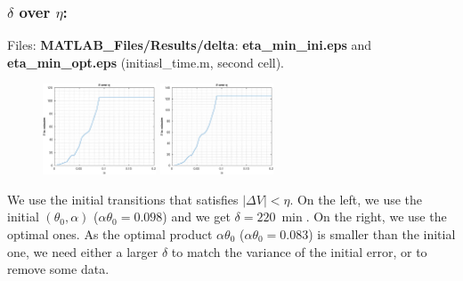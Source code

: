 \documentclass[aspectratio=169]{beamer}\usepackage[utf8]{inputenc}
\begin{document}
\begin{frame}\frametitle{$\delta$ over $\eta$:}

Files: \textbf{MATLAB\_Files/Results/delta}: \textbf{eta\_min\_ini.eps} and \textbf{eta\_min\_opt.eps} (initiasl\_time.m, second cell).\\

\begin{figure}[ht!]
\centering
\includegraphics[width=0.3\textwidth]{../../MATLAB_Files/Results/delta/eta_min_ini.eps}\quad\quad
\includegraphics[width=0.3\textwidth]{../../MATLAB_Files/Results/delta/eta_min_opt.eps}
\end{figure}
We use the initial transitions that satisfies $|\Delta V|<\eta$. On the left, we use the initial $(\theta_0,\alpha)$ ($\alpha\theta_0=0.098$) and we get $\delta=\SI{220}{\min}$. On the right, we use the optimal ones. As the optimal product $\alpha\theta_0$ ($\alpha\theta_0=0.083$) is smaller than the initial one, we need either a larger $\delta$ to match the variance of the initial error, or to remove some data.
\end{frame}

\end{document}
